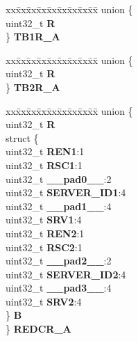 \begin{DoxyCompactItemize}
\begin{tabbing}
\end{tabbing}\item 
\mbox{\label{structETPU__tag_afd0df5828186d2a74ff56ae82533ff2e}} 
\begin{tabbing}
xx\=xx\=xx\=xx\=xx\=xx\=xx\=xx\=xx\=\kill
union \{\\
\>uint32\_t {\bfseries R}\\
\} {\bfseries TB1R\_A}\\

\end{tabbing}\item 
\mbox{\label{structETPU__tag_a4a97017ab95a4f5536686de9d785d02e}} 
\begin{tabbing}
xx\=xx\=xx\=xx\=xx\=xx\=xx\=xx\=xx\=\kill
union \{\\
\>uint32\_t {\bfseries R}\\
\} {\bfseries TB2R\_A}\\

\end{tabbing}\item 
\mbox{\label{structETPU__tag_aabf8fd35416b78d32db823d17cea6b48}} 
\begin{tabbing}
xx\=xx\=xx\=xx\=xx\=xx\=xx\=xx\=xx\=\kill
union \{\\
\>uint32\_t {\bfseries R}\\
\>struct \{\\
\>\>uint32\_t {\bfseries REN1}:1\\
\>\>uint32\_t {\bfseries RSC1}:1\\
\>\>uint32\_t {\bfseries \_\_pad0\_\_}:2\\
\>\>uint32\_t {\bfseries SERVER\_ID1}:4\\
\>\>uint32\_t {\bfseries \_\_pad1\_\_}:4\\
\>\>uint32\_t {\bfseries SRV1}:4\\
\>\>uint32\_t {\bfseries REN2}:1\\
\>\>uint32\_t {\bfseries RSC2}:1\\
\>\>uint32\_t {\bfseries \_\_pad2\_\_}:2\\
\>\>uint32\_t {\bfseries SERVER\_ID2}:4\\
\>\>uint32\_t {\bfseries \_\_pad3\_\_}:4\\
\>\>uint32\_t {\bfseries SRV2}:4\\
\>\} {\bfseries B}\\
\} {\bfseries REDCR\_A}\\


\end{tabbing}
\end{DoxyCompactItemize}
